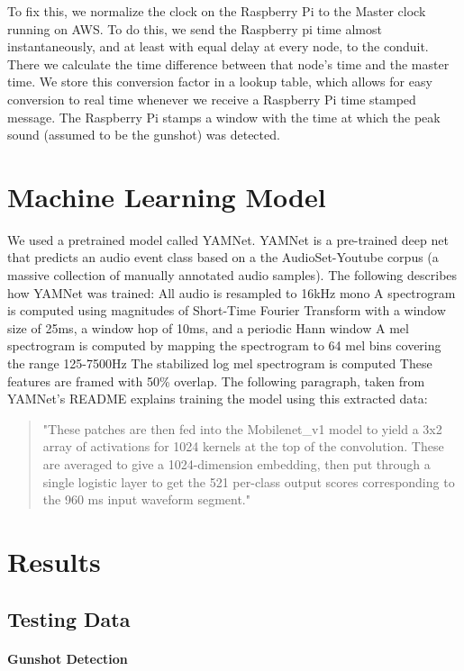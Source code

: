 \documentclass[conference]{IEEEtran}
\begin{document}
To fix this, we normalize the clock on the Raspberry Pi to the Master clock running on AWS. To do this, we send the Raspberry pi time almost instantaneously, and at least with equal delay at every node, to the conduit. There we calculate the time difference between that node’s time and the master time. We store this conversion factor in a lookup table, which allows for easy conversion to real time whenever we receive a Raspberry Pi time stamped message. The Raspberry Pi stamps a window with the time at which the peak sound (assumed to be the gunshot) was detected.

\section{Machine Learning Model}
We used a pretrained model called YAMNet. YAMNet is a pre-trained deep net that predicts an audio event class based on a the AudioSet-Youtube corpus (a massive collection of manually annotated audio samples). The following describes how YAMNet was trained: 
    All audio is resampled to 16kHz mono
    A spectrogram is computed using magnitudes of Short-Time Fourier Transform with a window size of 25ms, a window hop of 10ms, and a periodic Hann window
    A mel spectrogram is computed by mapping the spectrogram to 64 mel bins covering the range 125-7500Hz
    The stabilized log mel spectrogram is computed 
    These features are framed with 50\% overlap. 
The following paragraph, taken from YAMNet’s README explains training the model using this extracted data:
\begin{quote}
"These patches are then fed into the Mobilenet\_v1 model to yield a 3x2 array of activations for 1024 kernels at the top of the convolution. These are averaged to give a 1024-dimension embedding, then put through a single logistic layer to get the 521 per-class output scores corresponding to the 960 ms input waveform segment."
\end{quote}


\section{Results}

\subsection{Testing Data}

\paragraph{Gunshot Detection}
\end{document}
